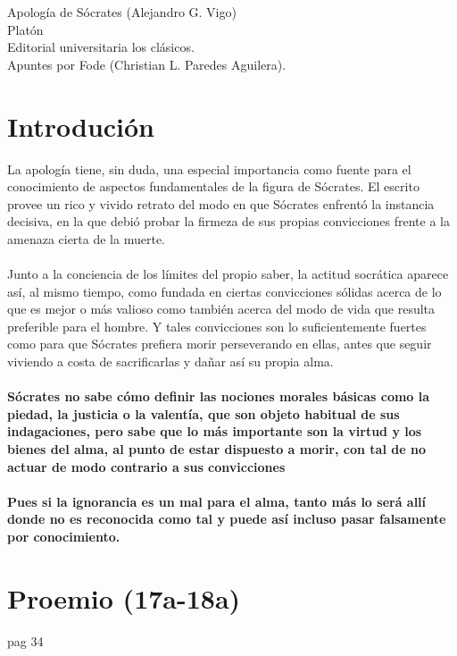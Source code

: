 \begin{center}
    \huge Apología de Sócrates (Alejandro G. Vigo)\\
    \vspace*{0.5cm}
    \large Platón\\
    Editorial universitaria los clásicos.\\
    \vspace{1cm}
    \Large Apuntes por Fode (Christian L. Paredes Aguilera).
    \vspace{1.5cm}
\end{center}

\section*{\center Introdución}

\begin{multicols}{2}

La apología tiene, sin duda, una especial importancia como fuente para el conocimiento de aspectos fundamentales de la figura de Sócrates. El escrito provee un rico y vivido retrato del modo en que Sócrates enfrentó la instancia decisiva, en la que debió probar la firmeza de sus propias convicciones frente a la amenaza cierta de la muerte. \\\\
Junto a la conciencia de los límites del propio saber, la actitud socrática aparece así, al mismo tiempo, como fundada en ciertas convicciones sólidas acerca de lo que es mejor o más valioso como también acerca del modo de vida que resulta preferible para el hombre. Y tales convicciones son lo suficientemente fuertes como para que Sócrates prefiera morir perseverando en ellas, antes que seguir viviendo a costa de sacrificarlas y dañar así su propia alma.\\\\
\textbf{Sócrates no sabe cómo definir las nociones morales básicas como la piedad, la justicia o la valentía, que son objeto habitual de sus indagaciones, pero sabe que lo más importante son la virtud y los bienes del alma, al punto de estar dispuesto a morir, con tal de no actuar de modo contrario a sus convicciones}\\\\

\textbf{Pues si la ignorancia es un mal para el alma, tanto más lo será allí donde no es reconocida como tal y puede así incluso pasar falsamente por conocimiento.}

\end{multicols}

\section*{\center Proemio (17a-18a)}
pag 34
